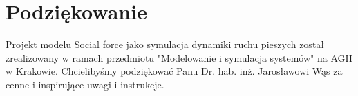 \chapter{Podziękowanie}
\hspace{4ex}Projekt modelu Social force jako symulacja dynamiki ruchu pieszych został zrealizowany w ramach przedmiotu "Modelowanie i symulacja systemów" na AGH w Krakowie. Chcielibyśmy podziękować Panu Dr. hab. inż. Jarosławowi Wąs za cenne i inspirujące uwagi i instrukcje.